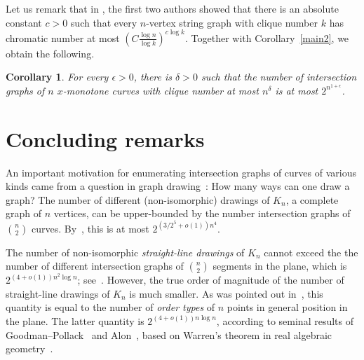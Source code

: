 \documentclass[11pt]{article}
\theoremstyle{plain}
\newtheorem{corollary}[theorem]{Corollary}
\theoremstyle{definition}
\theoremstyle{remark}
\begin{document}
 
 
 
 
 

Let us remark that in \cite{fpt}, the first two authors showed that there is an absolute constant $c> 0$ such that every $n$-vertex string graph with clique number $k$ has chromatic number at most $(C\frac{\log n}{\log k})^{c\log k}$. Together with Corollary~\ref{main2}, we obtain the following.

\begin{corollary}
For every $\epsilon>0$, there is $\delta>0$ such that the number of intersection graphs of $n$ $x$-monotone curves with clique number at most $n^{\delta}$ is at most $2^{n^{1+\epsilon}}$.
\end{corollary}


\section{Concluding remarks} 

An important motivation for enumerating intersection graphs of curves of various kinds came from a question in graph drawing~\cite{PT06}: How many ways can one draw a graph? The number of different (non-isomorphic) drawings of $K_n$, a complete graph of $n$ vertices, can be upper-bounded by the number intersection graphs of ${n\choose 2}$ curves. By~\cite{PT06}, this is at most $2^{(3/2^5+o(1))n^4}$. 

The number of non-isomorphic \emph{straight-line drawings} of $K_n$ cannot exceed the the number of different intersection graphs of ${n\choose 2}$ segments in the plane, which is $2^{(4+o(1))n^2\log n}$; see~\cite{S, PS}. However, the true order of magnitude of the number of straight-line drawings of $K_n$ is much smaller. As was pointed out in~\cite{PT06}, this quantity is equal to the number of \emph{order types} of $n$ points in general position in the plane. The latter quantity is $2^{(4+o(1))n\log n}$, according to seminal results of Goodman--Pollack~\cite{GP} and Alon~\cite{Al}, based on Warren's theorem in real algebraic geometry~\cite{W}. 
\end{document}
